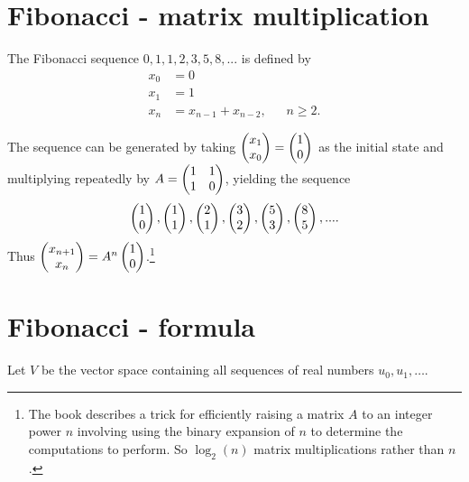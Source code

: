 \documentclass[12pt]{article}
\begin{document}
\section{Fibonacci - matrix multiplication}

\begin{definition*}
  The Fibonacci sequence $0, 1, 1, 2, 3, 5, 8, ...$ is defined by
  \begin{align*}
    x_0 &= 0\\
    x_1 &= 1\\
    x_{n} &= x_{n-1} + x_{n-2}, ~~~~~~~ n \geq 2.
  \end{align*}
\end{definition*}

\begin{remark*}
  The sequence can be generated by taking $\begin{pmatrix}x_1\\x_0\end{pmatrix} = \begin{pmatrix}1\\0\end{pmatrix}$ as the initial state and multiplying
  repeatedly by $A = \begin{pmatrix}1 & 1\\1 & 0\\ \end{pmatrix}$, yielding the sequence
  \begin{align*}
    \begin{pmatrix}1\\0\end{pmatrix}, \begin{pmatrix}1\\1\end{pmatrix}, \begin{pmatrix}2\\1\end{pmatrix}, \begin{pmatrix}3\\2\end{pmatrix}, \begin{pmatrix}5\\3\end{pmatrix}, \begin{pmatrix}8\\5\end{pmatrix}, ....
  \end{align*}
  Thus $\begin{pmatrix}x_{n+1}\\x_n\end{pmatrix} = A^n\begin{pmatrix}1\\0\end{pmatrix}$.\footnote{The book describes a trick for
    efficiently raising a matrix $A$ to an integer power $n$ involving using the binary expansion
    of $n$ to determine the computations to perform. So $\log_2(n)$ matrix multiplications rather
    than $n$.}
\end{remark*}

\newpage
\section{Fibonacci - formula}

Let $V$ be the vector space containing all sequences of real numbers
$u_0, u_1, \ldots$.

\begin{comment}
  \begin{proof}
    This is a vector space since:
    \begin{enumerate}
    \item It's an Abelian group under addition (the zero sequence is the additive identity, inverse
      is obtained by negating each element, addition is associative and commutative)
    \item Closed under scalar multiplication since $\lambda u_0, \lambda u_1, ... \in V$.
    \end{enumerate}
  \end{proof}
\end{comment}
\end{document}
